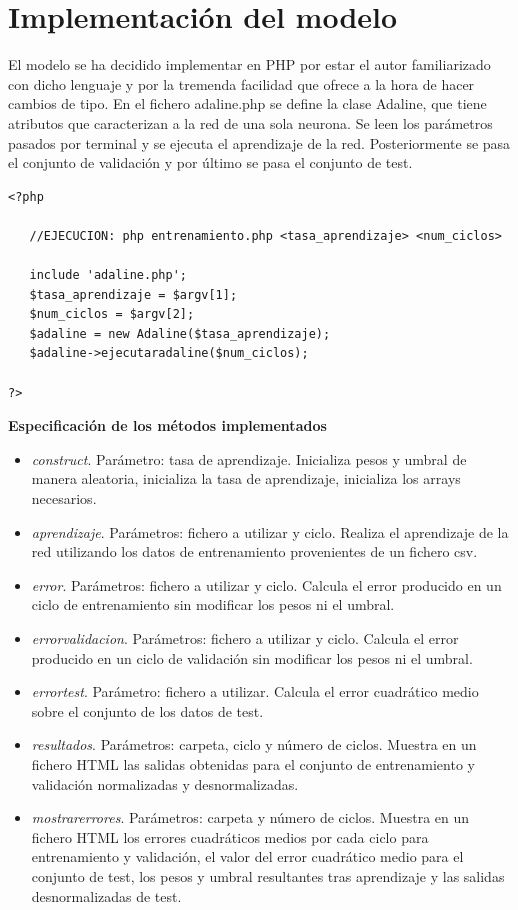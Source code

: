 \documentclass[11pt,spanish,listoffigures,listoftables]{tfgetsinf}
\begin{document}
\section{Implementación del modelo}

\par El modelo se ha decidido implementar en PHP por estar el autor familiarizado con dicho lenguaje y por la tremenda facilidad que ofrece a la hora de hacer cambios de tipo. En el fichero adaline.php se define la clase Adaline, que tiene atributos que caracterizan a la red de una sola neurona. Se leen los parámetros pasados por terminal y se ejecuta el aprendizaje de la red. Posteriormente se pasa el conjunto de validación y por último se pasa el conjunto de test.

\begin{lstlisting}
<?php

   //EJECUCION: php entrenamiento.php <tasa_aprendizaje> <num_ciclos>

   include 'adaline.php';
   $tasa_aprendizaje = $argv[1];
   $num_ciclos = $argv[2];
   $adaline = new Adaline($tasa_aprendizaje);
   $adaline->ejecutaradaline($num_ciclos);

?>
\end{lstlisting}

\par \textbf{Especificación de los métodos implementados}

\begin{itemize}
\item \textit{construct}. Parámetro: tasa de aprendizaje. Inicializa pesos y umbral de manera aleatoria, inicializa la tasa de aprendizaje, inicializa los arrays necesarios.
\item \textit{aprendizaje}. Parámetros: fichero a utilizar y ciclo. Realiza el aprendizaje de la red utilizando los datos de entrenamiento provenientes de un fichero csv.
\item \textit{error}. Parámetros: fichero a utilizar y ciclo. Calcula el error producido en un ciclo de entrenamiento sin modificar los pesos ni el umbral.
\item \textit{errorvalidacion}. Parámetros: fichero a utilizar y ciclo. Calcula el error producido en un ciclo de validación sin modificar los pesos ni el umbral.
\item \textit{errortest}. Parámetro: fichero a utilizar. Calcula el error cuadrático medio sobre el conjunto de los datos de test.
\item \textit{resultados}. Parámetros: carpeta, ciclo y número de ciclos. Muestra en un fichero HTML las salidas obtenidas para el conjunto de entrenamiento y validación normalizadas y desnormalizadas.
\item \textit{mostrarerrores}. Parámetros: carpeta y número de ciclos. Muestra en un fichero HTML los errores cuadráticos medios por cada ciclo para entrenamiento y validación, el valor del error cuadrático medio para el conjunto de test, los pesos y umbral resultantes tras aprendizaje y las salidas desnormalizadas de test.
\end{itemize}
\end{document}
